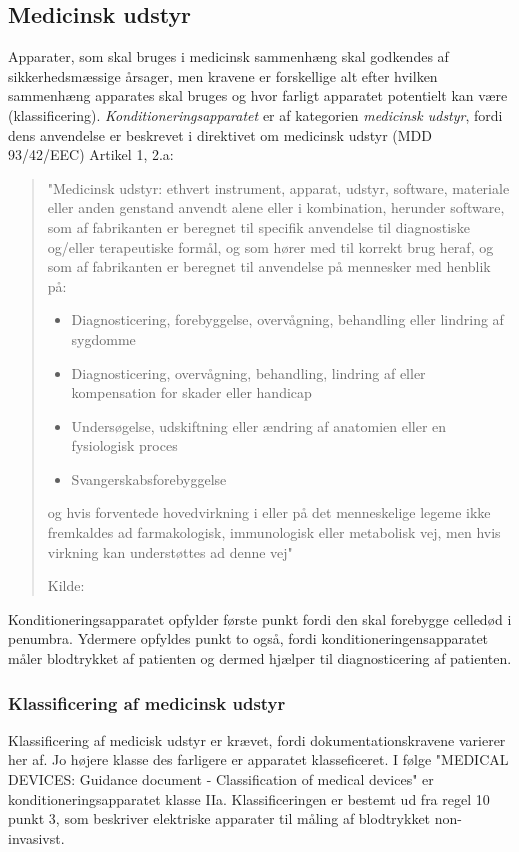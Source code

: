 \subsection{Medicinsk udstyr}
Apparater, som skal bruges i medicinsk sammenhæng skal godkendes af sikkerhedsmæssige årsager, men kravene er forskellige alt efter hvilken sammenhæng apparates skal bruges og hvor farligt apparatet potentielt kan være (klassificering). \textit{Konditioneringsapparatet} er af kategorien \textit{medicinsk udstyr}, fordi dens anvendelse er beskrevet i direktivet om medicinsk udstyr (MDD 93/42/EEC) Artikel 1, 2.a:

\begin{quote}
	"Medicinsk udstyr: ethvert instrument, apparat, udstyr, software,
	materiale eller anden genstand anvendt alene eller i kombination,
	herunder software, som af fabrikanten er beregnet til specifik anvendelse
	til diagnostiske og/eller terapeutiske formål, og som hører med
	til korrekt brug heraf, og som af fabrikanten er beregnet til anvendelse
	på mennesker med henblik på:
	\begin{itemize}
		\item Diagnosticering, forebyggelse, overvågning, behandling eller
		lindring af sygdomme
		\item Diagnosticering, overvågning, behandling, lindring af eller
		kompensation for skader eller handicap
		\item Undersøgelse, udskiftning eller ændring af anatomien eller en
		fysiologisk proces
		\item Svangerskabsforebyggelse
	\end{itemize}
	
	og hvis forventede hovedvirkning i eller på det menneskelige
	legeme ikke fremkaldes ad farmakologisk, immunologisk eller metabolisk
	vej, men hvis virkning kan understøttes ad denne vej"
	
	Kilde:  
\end{quote}

Konditioneringsapparatet opfylder første punkt fordi den skal forebygge celledød i penumbra. Ydermere opfyldes punkt to også, fordi konditioneringensapparatet måler blodtrykket af patienten og dermed hjælper til diagnosticering af patienten.

\subsubsection{Klassificering af medicinsk udstyr}
Klassificering af medicisk udstyr er krævet, fordi dokumentationskravene varierer her af. Jo højere klasse des farligere er apparatet klasseficeret. I følge "MEDICAL DEVICES: Guidance document - Classification of medical devices" er konditioneringsapparatet klasse IIa. Klassificeringen er bestemt ud fra regel 10 punkt 3, som beskriver elektriske apparater til måling af blodtrykket non-invasivst.

